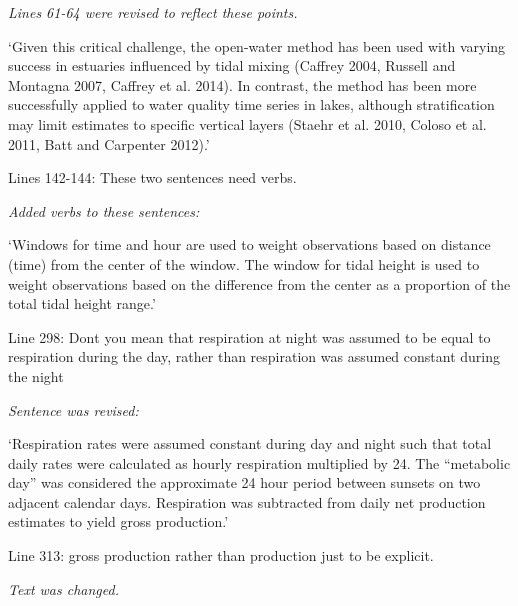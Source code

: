 \documentclass[letterpaper,12pt]{article}\usepackage[]{graphicx}\usepackage[]{color}
\begin{document}
{\it Lines 61-64 were revised to reflect these points.

`Given this critical challenge, the open-water method has been used with varying success in estuaries influenced by tidal mixing (Caffrey 2004, Russell and Montagna 2007, Caffrey et al. 2014).  In contrast, the method has been more successfully applied to water quality time series in lakes, although stratification may limit estimates to specific vertical layers (Staehr et al. 2010, Coloso et al. 2011, Batt and Carpenter 2012).'
}

Lines 142-144: These two sentences need verbs.

{\it Added verbs to these sentences:

`Windows for time and hour are used to weight observations based on distance (time) from the center of the window.  The window for tidal height is used to weight observations based on the difference from the center as a proportion of the total tidal height range.'
}

Line 298: Dont you mean that respiration at night was assumed to be equal to respiration during the day, rather than respiration was assumed constant during the night

{\it Sentence was revised:

`Respiration rates were assumed constant during day and night such that total daily rates were calculated as hourly respiration multiplied by 24. The ``metabolic day'' was considered the approximate 24 hour period between sunsets on two adjacent calendar days. Respiration was subtracted from daily net production estimates to yield gross production.'
}

Line 313: gross production rather than production just to be explicit.

{\it Text was changed.}
\end{document}

